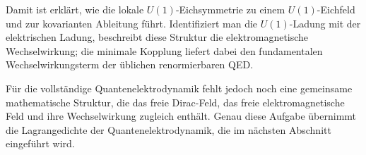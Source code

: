 Damit ist erklärt, wie die lokale \(U(1)\)-Eichsymmetrie zu einem
\(U(1)\)-Eichfeld und zur kovarianten Ableitung führt. Identifiziert man
die \(U(1)\)-Ladung mit der elektrischen Ladung, beschreibt diese
Struktur die elektromagnetische Wechselwirkung; die minimale Kopplung
liefert dabei den fundamentalen Wechselwirkungsterm der üblichen
renormierbaren QED.

Für die vollständige Quantenelektrodynamik fehlt jedoch noch eine
gemeinsame mathematische Struktur, die das freie Dirac-Feld, das freie
elektromagnetische Feld und ihre Wechselwirkung zugleich enthält.
Genau diese Aufgabe übernimmt die Lagrangedichte der
Quantenelektrodynamik, die im nächsten Abschnitt eingeführt wird.
